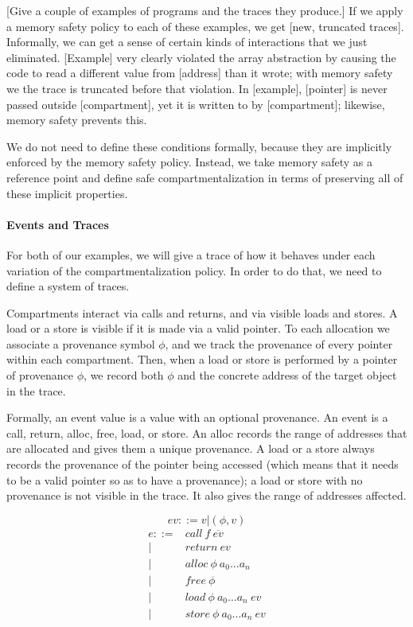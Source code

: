\documentclass{article}
\begin{document}
[Give a couple of examples of programs and the traces they produce.]
If we apply a memory safety policy to each of these examples, we get [new, truncated traces]. 
Informally, we can get a sense of certain kinds of interactions that we just eliminated.
[Example] very clearly violated the array abstraction  by
causing the code to read a different value from [address] than it wrote; with memory safety
we the trace is truncated before that violation. In [example], [pointer] is never passed outside
[compartment], yet it is written to by [compartment]; likewise, memory safety prevents this.

We do not need to define these conditions formally, because they are implicitly enforced by
the memory safety policy. Instead, we take memory safety as a reference point and define safe
compartmentalization in terms of preserving all of these implicit properties.

\paragraph{Events and Traces}

For both of our examples, we will give a trace of how
it behaves under each variation of the compartmentalization policy. In order to do that, we
need to define a system of traces.

Compartments interact via calls and returns, and via visible loads and stores. A load or a store
is visible if it is made via a valid pointer. To each allocation we associate a provenance
symbol \(\phi\), and we track the provenance of every pointer within each compartment.
Then, when a load or store is performed by a pointer of provenance \(\phi\), we record both
\(\phi\) and the concrete address of the target object in the trace.

Formally, an event value is a value with an optional provenance. An event is a call, return,
alloc, free, load, or store. An alloc records the range of addresses that are allocated and
gives them a unique provenance. A load or a store always records the provenance of the pointer
being accessed (which means that it needs to be a valid pointer so as to have a provenance);
a load or store with no provenance is not visible in the trace. It also gives the range of
addresses affected.

\[ev ::= v | (\phi, v)\]
\[\begin{split}
e ::= & \mathit{call} ~ f ~ \overline{ev} \\
| & \mathit{return} ~ ev \\
| & \mathit{alloc} ~ \phi ~ a_0 \dots a_n \\
| & \mathit{free} ~ \phi \\
| & \mathit{load} ~ \phi ~ a_0 \dots a_n ~ ev \\
| & \mathit{store} ~ \phi ~ a_0 \dots a_n ~ ev \\
\end{split}\]
\end{document}
